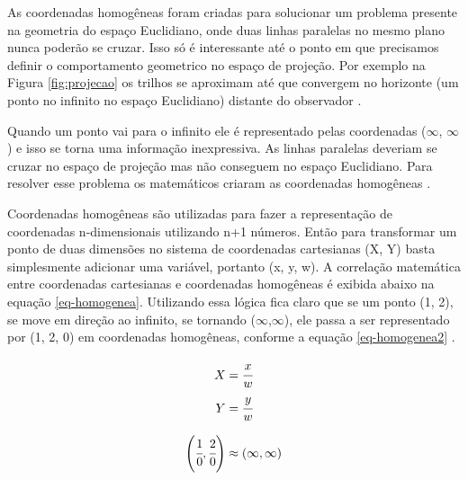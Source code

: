 \label{an:coordenadas-homogeneas}

As coordenadas homogêneas foram criadas para solucionar um problema presente na geometria do espaço Euclidiano, onde duas linhas paralelas no mesmo plano nunca poderão se cruzar. Isso só é interessante até o ponto em que precisamos definir o comportamento geometrico no espaço de projeção. Por exemplo na Figura \ref{fig:projecao} os trilhos se aproximam até que convergem no horizonte (um ponto no infinito no espaço Euclidiano) distante do observador \cite{homogenous}.

	\begin{figure}[h!]
		\centering
	\end{figure}

Quando um ponto vai para o infinito ele é representado pelas coordenadas ($\infty$, $\infty$) e isso se torna uma informação inexpressiva. As linhas paralelas deveriam se cruzar no espaço de projeção mas não conseguem no espaço Euclidiano. Para resolver esse problema os matemáticos criaram as coordenadas homogêneas \cite{homogenous}.

Coordenadas homogêneas são utilizadas para fazer a representação de coordenadas n-dimensionais utilizando n+1 números. Então para transformar um ponto de duas dimensões no sistema de coordenadas cartesianas (X, Y) basta simplesmente adicionar uma variável, portanto (x, y, w). A correlação matemática entre coordenadas cartesianas e coordenadas homogêneas é exibida abaixo na equação \ref{eq-homogenea}. Utilizando essa lógica fica claro que se um ponto (1, 2), se move em direção ao infinito, se tornando ($\infty$,$\infty$), ele passa a ser representado por (1, 2, 0) em coordenadas homogêneas, conforme a equação \ref{eq-homogenea2} \cite{homogenous}.

\begin{equation} \label{eq-homogenea}
	\begin{aligned}
	X = \cfrac{x}{w} \\
	Y = \cfrac{y}{w} 
	\end{aligned}
\end{equation}

\begin{equation} \label{eq-homogenea2}
	\begin{aligned}
		\left(\cfrac{1}{0}, \cfrac{2}{0}\right) \approx (\infty,\infty)
	\end{aligned}
\end{equation}